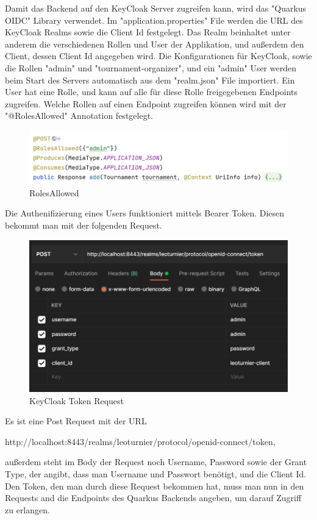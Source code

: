 Damit das Backend auf den KeyCloak Server zugreifen kann, wird das "Quarkus OIDC" Library verwendet. Im "application.properties" File werden die URL des KeyCloak Realms 
sowie die Client Id festgelegt. Das Realm beinhaltet unter anderem die verschiedenen Rollen und User der Applikation, und außerdem den Client, dessen Client Id angegeben wird. 
Die Konfigurationen für KeyCloak, sowie die Rollen "admin" und "tournament-organizer", und ein "admin" User werden beim Start des Servers automatisch aus dem "realm.json" File importiert.
Ein User hat eine Rolle, und kann auf alle für diese Rolle freigegebenen Endpoints zugreifen.
Welche Rollen auf einen Endpoint zugreifen können wird mit der "@RolesAllowed" Annotation festgelegt. 

\begin{figure}[H]
    \includegraphics[scale=0.6]{pics/backend/rolesAllowed.png}
    \caption{RolesAllowed}
\end{figure}

Die Authenifizierung eines Users funktioniert mittels Bearer Token. Diesen bekommt man mit der folgenden Request.

\begin{figure}[H]
    \includegraphics[scale=0.6]{pics/backend/keycloak_token_request.png}
    \caption{KeyCloak Token Request}
\end{figure}

Es ist eine Post Request mit der URL 

http://localhost:8443/realms/leoturnier/protocol/openid-connect/token, 

außerdem steht im Body der Request noch Username, Password sowie der Grant Type, der angibt, dass man Username und Passwort benötigt, und die Client Id. 
Den Token, den man durch diese Request bekommen hat, muss man nun in den Requests and die Endpoints des Quarkus Backends angeben, um darauf Zugriff zu erlangen.